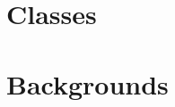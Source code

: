 \documentclass[10pt,twoside,twocolumn,openany,a4paper]{book}
\begin{document}
\tableofcontents
\chapter{Classes}

\chapter{Backgrounds}

\end{document}

